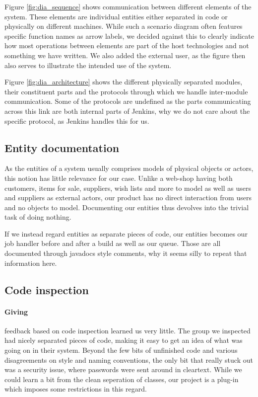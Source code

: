 \documentclass[a4paper,11pt]{article}
\begin{document}
Figure \ref{fig:dia_sequence} shows communication between different elements of
the system. These elements are individual entities either separated in code or
physically on different machines. While such a scenario diagram often features
specific function names as arrow labels, we decided against this to clearly
indicate how most operations between elements are part of the host technologies
and not something we have written. We also added the external user, as the figure
then also serves to illustrate the intended use of the system.

Figure \ref{fig:dia_architecture} shows the different physically separated modules,
their constituent parts and the protocols through which we handle inter-module
communication. Some of the protocols are undefined as the parts communicating
across this link are both internal parts of Jenkins, why we do not care about the
specific protocol, as Jenkins handles this for us. 

\subsection{Entity documentation}
As the entities of a system usually comprises models of physical objects or actors,
this notion has little relevance for our case. Unlike a web-shop having both
customers, items for sale, suppliers, wish lists and more to model as well as
users and suppliers as external actors, our product has no direct interaction from
users and no objects to model. Documenting our entities thus devolves into the
trivial task of doing nothing.

If we instead regard entities as separate pieces of code, our entities becomes our
job handler before and after a build as well as our queue. Those are all
documented through javadocs style comments, why it seems silly to repeat that information
here.

\subsection{Code inspection}
\label{sec:inspection}
\paragraph{Giving} feedback based on code inspection learned us very little. The
group we inspected had nicely separated pieces of code, making it easy to get an
idea of what was going on in their system. Beyond the few bits of unfinished code
and various disagreements on style and naming conventions, the only bit that
really stuck out was a security issue, where passwords were sent around in
cleartext. While we could learn a bit from the clean seperation of classes, our
project is a plug-in which imposes some restrictions in this regard.
\end{document}
